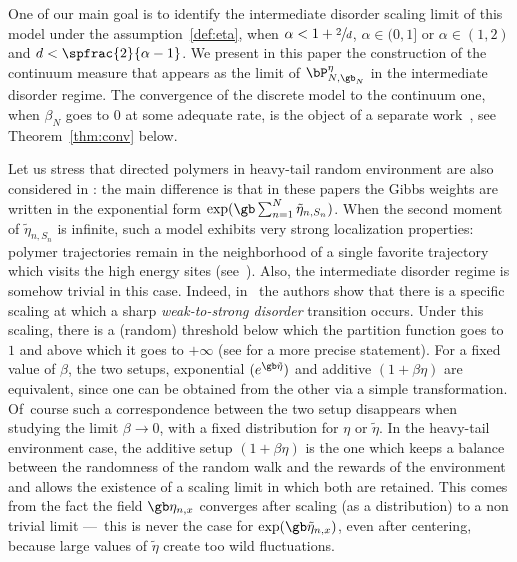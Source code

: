 One of our main goal is to identify the intermediate disorder scaling limit of this model under the assumption~\eqref{def:eta}, when $\alpha<1+\sfrac{2}{d}$, \ie $\alpha\in (0,1]$ or $\alpha \in (1,2)$ and $d<\spfrac{2}{\alpha-1}$.
We present in this paper the construction of the continuum measure that appears as the limit of $\bP_{N,\gb_N}^{\eta}$ in the intermediate disorder regime. The convergence of the discrete model to the continuum one, when $\beta_N$ goes to $0$
at some adequate rate, is the object of a separate work~\cite{BL20_disc},
see Theorem~\ref{thm:conv} below.

\begin{rem}
\label{rem:weights}
Let us stress that
directed polymers in heavy-tail random environment are also considered in \cite{AL11,BT19,DZ16}:
the main difference is that in these papers the Gibbs weights are written in the exponential form $\exp(\gb \sum_{n=1}^N \tilde \eta_{n,S_n})$.
When the second moment of $\tilde \eta_{n,S_n}$ is infinite,
such a model exhibits very strong localization properties:
polymer trajectories remain in the neighborhood of a single favorite trajectory which visits the high energy sites (see~\cite{AL11,BT19}).
Also, the intermediate disorder regime is somehow trivial
in this case. Indeed, in~\cite{BT19} the authors show that there is a specific scaling at which
a sharp \emph{weak-to-strong disorder} transition occurs.
Under this scaling, there is a (random) threshold below which
the partition function goes to~$1$ and above which it goes to $+\infty$ (see \cite[Th.\,2.7-2.8]{BT19}
for a more precise statement).
For a fixed value of $\beta$, the two setups, exponential $(e^{\gb \tilde \eta})$ and additive $(1+\beta\eta)$ are equivalent, since one can be obtained from the other via a simple transformation. Of~course such a correspondence between the two setup disappears when studying the limit $\beta\to 0$, with a fixed distribution for $\eta$ or $\tilde \eta$. In the heavy-tail environment case, the additive setup $(1+\beta \eta)$ is the one which keeps a balance between the randomness of the random walk and the rewards of the environment and allows the existence of a scaling limit in which both are retained.
This comes from the fact the field $\gb \eta_{n,x}$ converges after scaling (as a distribution) to a non trivial limit ---~this is never the case for $\exp(\gb \tilde \eta_{n,x})$, even after centering, because large values of $\tilde \eta$ create too wild fluctuations.
\end{rem}


